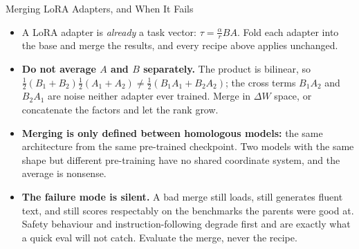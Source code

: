 \begin{frame}[t]{Merging LoRA Adapters, and When It Fails}
  \begin{itemize}\itemsep0.45em
    \item[\textcolor{red}{$\blacktriangleright$}] A LoRA adapter is \emph{already} a task vector: $\tau = \tfrac{\alpha}{r}BA$. Fold each adapter into the base and merge the results, and every recipe above applies unchanged.
    \item[\textcolor{red}{$\blacktriangleright$}] \textbf{Do not average $A$ and $B$ separately.} The product is bilinear, so
      $\tfrac{1}{2}(B_1 + B_2)\tfrac{1}{2}(A_1 + A_2) \neq \tfrac{1}{2}(B_1A_1 + B_2A_2)$;
      the cross terms $B_1A_2$ and $B_2A_1$ are noise neither adapter ever trained. Merge in $\Delta W$ space, or concatenate the factors and let the rank grow.
    \item[\textcolor{red}{$\blacktriangleright$}] \textbf{Merging is only defined between homologous models:} the same architecture from the same pre-trained checkpoint. Two models with the same shape but different pre-training have no shared coordinate system, and the average is nonsense.
    \item[\textcolor{red}{$\blacktriangleright$}] \textbf{The failure mode is silent.} A bad merge still loads, still generates fluent text, and still scores respectably on the benchmarks the parents were good at. Safety behaviour and instruction-following degrade first and are exactly what a quick eval will not catch. Evaluate the merge, never the recipe.
  \end{itemize}
\end{frame}

